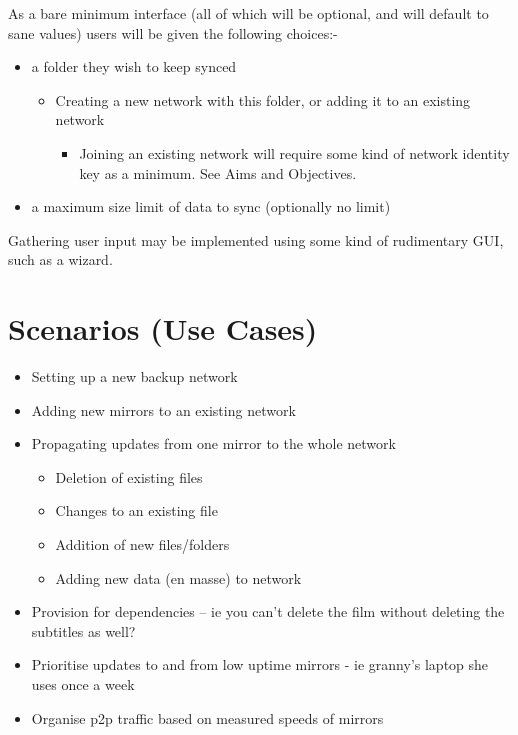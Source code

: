 \documentclass[12pt,a4paper,]{adreport}
\begin{document}
As a bare minimum interface (all of which will be optional, and will
default to sane values) users will be given the following choices:-

\begin{itemize}
\itemsep1pt\parskip0pt
\item
  a folder they wish to keep synced

  \begin{itemize}
  \itemsep1pt\parskip0pt
  \item
    Creating a new network with this folder, or adding it to an existing
    network

    \begin{itemize}
    \itemsep1pt\parskip0pt
    \item
      Joining an existing network will require some kind of network
      identity key as a minimum. See Aims and Objectives.
    \end{itemize}
  \end{itemize}
\item
  a maximum size limit of data to sync (optionally no limit)
\end{itemize}

Gathering user input may be implemented using some kind of rudimentary
GUI, such as a wizard.

\chapter{Scenarios (Use Cases)}\label{scenarios-use-cases}

\begin{itemize}
\itemsep1pt\parskip0pt
\item
  Setting up a new backup network
\item
  Adding new mirrors to an existing network
\item
  Propagating updates from one mirror to the whole network

  \begin{itemize}
  \itemsep1pt\parskip0pt
  \item
    Deletion of existing files
  \item
    Changes to an existing file
  \item
    Addition of new files/folders
  \item
    Adding new data (en masse) to network
  \end{itemize}
\item
  Provision for dependencies -- ie you can't delete the film without
  deleting the subtitles as well?
\item
  Prioritise updates to and from low uptime mirrors - ie granny's laptop
  she uses once a week
\item
  Organise p2p traffic based on measured speeds of mirrors
\end{itemize}
\end{document}
